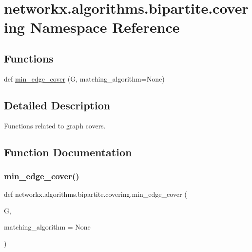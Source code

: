 \hypertarget{namespacenetworkx_1_1algorithms_1_1bipartite_1_1covering}{}\section{networkx.\+algorithms.\+bipartite.\+covering Namespace Reference}
\label{namespacenetworkx_1_1algorithms_1_1bipartite_1_1covering}
\subsection*{Functions}
\begin{DoxyCompactItemize}
\item 
def \hyperlink{namespacenetworkx_1_1algorithms_1_1bipartite_1_1covering_a8aa419a037d4a8307c567110a5d39f70}{min\+\_\+edge\+\_\+cover} (G, matching\+\_\+algorithm=None)
\end{DoxyCompactItemize}


\subsection{Detailed Description}
\begin{DoxyVerb}Functions related to graph covers.\end{DoxyVerb}
 

\subsection{Function Documentation}
\mbox{\label{namespacenetworkx_1_1algorithms_1_1bipartite_1_1covering_a8aa419a037d4a8307c567110a5d39f70}} 
\subsubsection{\texorpdfstring{min\+\_\+edge\+\_\+cover()}{min\_edge\_cover()}}
{\footnotesize\ttfamily def networkx.\+algorithms.\+bipartite.\+covering.\+min\+\_\+edge\+\_\+cover (\begin{DoxyParamCaption}\item[{}]{G,  }\item[{}]{matching\+\_\+algorithm = {\ttfamily None} }\end{DoxyParamCaption})}

